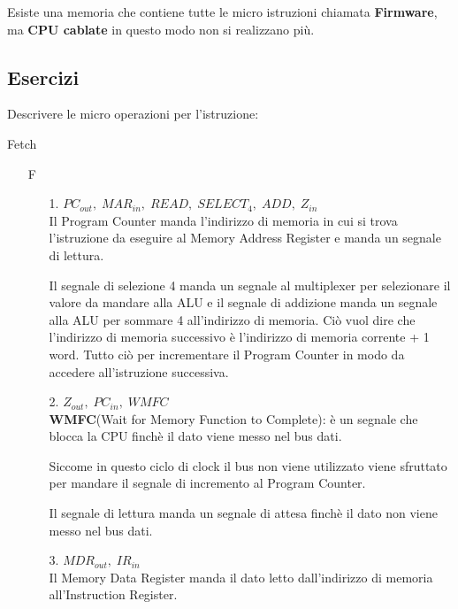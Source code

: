 \documentclass[a4paper]{article}
\theoremstyle{break}
\theoremstyle{break}
\theoremstyle{break}
\theoremstyle{break}
\begin{document}
\noindent Esiste una memoria che contiene tutte le micro istruzioni chiamata \textbf{Firmware},
ma \textbf{CPU cablate} in questo modo non si realizzano più.

\subsection{Esercizi}

\begin{exercise}
	Descrivere le micro operazioni per l'istruzione:
	\begin{center}
		Fetch
	\end{center}

	\begin{enumerate}
		\item[F]
		      \begin{enumerate}
			      \item[1.] \( PC_{out},\; MAR_{in},\; READ ,\; SELECT_4,\; ADD,\; Z_{in}\) \\
			            Il Program Counter manda l'indirizzo di memoria in cui si trova l'istruzione da eseguire
			            al Memory Address Register e manda un segnale di lettura.

			            Il segnale di selezione 4 manda un segnale al multiplexer per selezionare il valore
			            da mandare alla ALU e il segnale di addizione manda un segnale alla ALU per sommare
			            4 all'indirizzo di memoria. Ciò vuol dire che l'indirizzo di memoria successivo è
			            l'indirizzo di memoria corrente + 1 word. Tutto ciò per incrementare il Program
			            Counter in modo da accedere all'istruzione successiva.

			      \item[2.] \( Z_{out},\; PC_{in},\;WMFC \)  \\
			            \textbf{WMFC}(Wait for Memory Function to Complete): è un segnale che blocca
			            la CPU finchè il dato viene messo nel bus dati.

			            Siccome in questo ciclo di clock il bus non viene utilizzato viene sfruttato per
			            mandare il segnale di incremento al Program Counter.

			            Il segnale di lettura manda un segnale di attesa finchè il dato non viene messo nel bus dati.
			      \item[3.] \( MDR_{out},\; IR_{in} \) \\
			            Il Memory Data Register manda il dato letto dall'indirizzo di memoria all'Instruction Register.
		      \end{enumerate}
	\end{enumerate}
\end{exercise}
\end{document}
